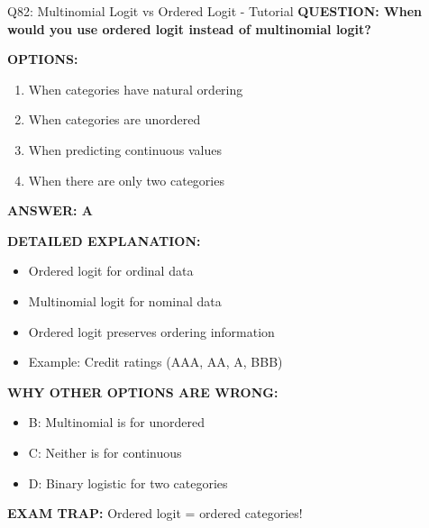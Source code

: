 \documentclass[8pt]{beamer}
\begin{document}
	\begin{frame}{Q82: Multinomial Logit vs Ordered Logit - Tutorial}
		\fontsize{6.5}{7.5}\selectfont
		\textbf{QUESTION: When would you use ordered logit instead of multinomial logit?}
		
		\vspace{0.1cm}
		\textbf{OPTIONS:}
		\begin{enumerate}
			\item When categories have natural ordering
			\item When categories are unordered
			\item When predicting continuous values
			\item When there are only two categories
		\end{enumerate}
		
		\vspace{0.1cm}
		\textcolor{myblue}{\textbf{ANSWER: A}}
		
		\vspace{0.1cm}
		\textbf{DETAILED EXPLANATION:}
		\begin{itemize}
			\item Ordered logit for ordinal data
			\item Multinomial logit for nominal data
			\item Ordered logit preserves ordering information
			\item Example: Credit ratings (AAA, AA, A, BBB)
		\end{itemize}
		
		\vspace{0.1cm}
		\textcolor{myred}{\textbf{WHY OTHER OPTIONS ARE WRONG:}}
		\begin{itemize}
			\item \textcolor{myred}{B:} Multinomial is for unordered
			\item \textcolor{myred}{C:} Neither is for continuous
			\item \textcolor{myred}{D:} Binary logistic for two categories
		\end{itemize}
		
		\textcolor{myred}{\textbf{EXAM TRAP:}} Ordered logit = \textcolor{myblue}{ordered categories}!
	\end{frame}
	
\end{document}
